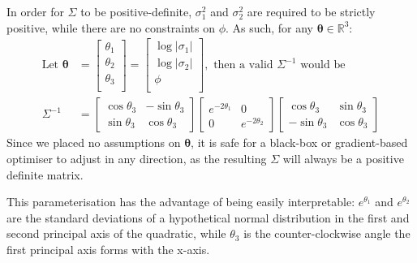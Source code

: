 \documentclass[a4paper, 12pt]{report}
\begin{document}
In order for $\Sigma$ to be positive-definite, $\sigma_1^2$ and $\sigma_2^2$ are required to be strictly positive, while there are no constraints on $\phi$. As such, for any $\boldsymbol{\theta}\in\mathbb{R}^3$:
\begin{align}
\textrm{Let }\boldsymbol{\theta}&=\begin{bmatrix}
	\theta_1\\
	\theta_2\\
	\theta_3\\
\end{bmatrix}=\begin{bmatrix}
	\log|\sigma_1| \\
	\log|\sigma_2|\\
	\phi\\
\end{bmatrix}, \textrm{ then a valid $\Sigma^{-1}$ would be} \\
\Sigma^{-1} &= \begin{bmatrix}
	\cos \theta_3 & -\sin \theta_3 \\ \sin\theta_3 & \cos\theta_3
\end{bmatrix}\begin{bmatrix}
	 e^{-2\theta_1} & 0\\ 0 &  e^{-2\theta_2}
\end{bmatrix} \begin{bmatrix}
	\cos \theta_3 & \sin \theta_3 \\ -\sin\theta_3 & \cos\theta_3
\end{bmatrix}
\end{align}
Since we placed no assumptions on $\boldsymbol{\theta}$, it is safe for a black-box or gradient-based optimiser to adjust in any direction, as the resulting $\Sigma$ will always be a positive definite matrix.

This parameterisation has the advantage of being easily interpretable: $e^{\theta_1}$ and $e^{\theta_2}$ are the standard deviations of a hypothetical normal distribution in the first and second principal axis of the quadratic, while $\theta_3$ is the counter-clockwise angle the first principal axis forms with the x-axis.
\end{document}
